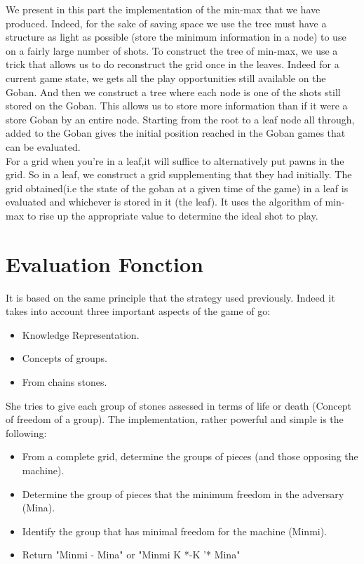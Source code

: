 \documentclass{report}
\begin{document}
\vspace{1cm}

We present in this part the implementation of the min-max that we have produced.
Indeed, for the sake of saving space we use the tree must have a
structure as light as possible (store the minimum information in a node) to
use on a fairly large number of shots.
To construct the tree of min-max, we use a trick that allows us to do
reconstruct the grid once in the leaves. Indeed for a current game state, we
gets all the play opportunities still available on the Goban. And then we
construct a tree where each node is one of the shots still stored on the Goban.
This allows us to store more information than if it were a store
Goban by an entire node.
Starting from the root to a leaf node all through, added to the Goban
gives the initial position reached in the Goban games that can be evaluated.\\

For a grid when you're in a leaf,it will suffice to
alternatively put pawns in the grid. So in a leaf, we construct a grid
supplementing that they had initially. The grid obtained(i.e the state of the goban at a given time of the game) in a leaf is evaluated and
whichever is stored in it (the leaf). It uses the algorithm of min-max to rise
up the appropriate value to determine the ideal shot to play.\\

\section*{Evaluation Fonction }
It is based on the same principle that the strategy used previously. Indeed it
takes into account three important aspects of the game of go:\\

\begin{itemize}
   \item Knowledge Representation.
    \item Concepts of groups.
    \item From chains stones.
\end{itemize}

She tries to give each group of stones assessed in terms of life or death
(Concept of freedom of a group).
The implementation, rather powerful and simple is the following:\\

\begin{itemize}
    \item From a complete grid, determine the groups of pieces (and those opposing
        the machine).
    \item Determine the group of pieces that the minimum freedom in the adversary (Mina).
   \item Identify the group that has minimal freedom for the machine (Minmi).
    \item Return  { "Minmi - Mina"} or { "Minmi K *-K '* Mina"}
\end{itemize}
\end{document}
